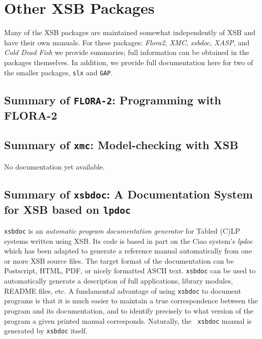 \chapter{Other XSB Packages} \label{sec:otherpackages}

Many of the XSB packages are maintained somewhat independently of XSB
and have their own manuals.  For these packages: {\em Flora2}, {\em
XMC}, {\em xsbdoc}, {\em XASP}, and {\em Cold Dead Fish} we provide
summaries; full information can be obtained in the packages
themselves.  In addition, we provide full documentation here for two
of the smaller packages, {\tt slx} and {\tt GAP}.

\section{Summary of {\tt FLORA-2}: Programming with FLORA-2}
\label{package:flora2} 




\section{Summary of {\tt xmc}: Model-checking with XSB}
\label{package:xmc} 

No documentation yet available.

\section{Summary of {\tt xsbdoc}: A Documentation System for XSB based
on {\tt lpdoc}}
\label{package:xsbdoc} 

{\tt xsbdoc} is an {\em automatic program documentation generator} for
Tabled (C)LP systems written using XSB.  Its code is based in part on
the Ciao \cite{ciao-man} system's {\em lpdoc} which has been adapted
to generate a reference manual automatically from one or more XSB
source files.  The target format of the documentation can be
Postscript, HTML, PDF, or nicely formatted ASCII text.  {\tt xsbdoc}
can be used to automatically generate a description of full
applications, library modules, README files, etc.  A fundamental
advantage of using {\tt xsbdoc} to document programs is that it is
much easier to maintain a true correspondence between the program and
its documentation, and to identify precisely to what version of the
program a given printed manual corresponds.  Naturally, the {\tt
xsbdoc} manual is generated by {\tt xsbdoc} itself.

